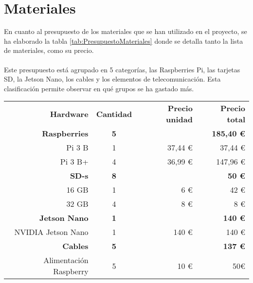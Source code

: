 \newpage
\section{Materiales}
En cuanto al presupuesto de los materiales que se han utilizado en el proyecto, se ha elaborado la tabla \ref{tab:PresupuestoMateriales} donde se detalla tanto la lista de materiales, como su precio.
\\ \\
Este presupuesto está agrupado en 5 categorías, las Raspberries Pi, las tarjetas SD, la Jetson Nano, los cables y los elementos de telecomunicación. Esta clasificación permite observar en qué grupos se ha gastado más. 

\begin{table}[H]
    \begin{center}
        \begin{tabular}{|r|c|r|r|}
            \hline
            \rowcolor{Cyan} 
            \multicolumn{4}{|c|}{\textbf{Materiales}}\\
            \hline
            \textbf{Hardware} & \textbf{Cantidad} & \textbf{Precio unidad}& \textbf{Precio total}\\ 
            \hline
            \rowcolor{GrisTabla}
            \textbf{Raspberries} &  \textbf{5} & & \textbf{185,40 \euro}\\
            Pi 3 B & 1 & 37,44 \euro & 37,44 \euro\\
            Pi 3 B+ & 4 & 36,99 \euro & 147,96 \euro\\
            \hline
            \rowcolor{GrisTabla}
            \textbf{SD-s} &  \textbf{8} & & \textbf{50 \euro}\\
            16 GB & 1 & 6 \euro & 42 \euro\\
            32 GB & 4 & 8 \euro & 8 \euro\\
            \hline
            \rowcolor{GrisTabla}
            \textbf{Jetson Nano} & \textbf{1} & & \textbf{140 \euro}\\
            NVIDIA Jetson Nano & 1 & 140 \euro & 140 \euro\\
            \hline
            \rowcolor{GrisTabla}
            \textbf{Cables} &  \textbf{5} & & \textbf{137 \euro}\\
            Alimentación Raspberry & 5 & 10 \euro & 50\euro\\

\end{tabular}
\end{center}
\end{table}
